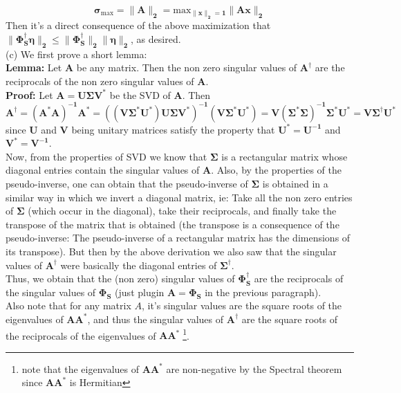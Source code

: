 \documentclass[a4paper,11pt]{article}
\numberwithin{definition}{section}
\numberwithin{mytheorem}{subsection}
\begin{document}
$$\boldsymbol{\sigma_{\mathrm{max}} = \lVert A\rVert_2 = \mathrm{max}_{\lVert x\rVert_2 = 1}\lVert Ax\rVert_2}$$
Then it's a direct consequence of the above maximization that $\boldsymbol{\lVert\Phi_S^{\dagger}\eta\rVert_2 \leq \lVert\Phi_S^{\dagger}\rVert_2\lVert\eta\rVert_2}$, as desired.
\\
(c) We first prove a short lemma:\\
\textbf{Lemma: } Let $\boldsymbol{A}$ be any matrix. Then the non zero singular values of $\boldsymbol{A^{\dagger}}$ are the reciprocals of the non zero singular values of $\boldsymbol{A}$.\\
\textbf{Proof: } Let $\boldsymbol{A = U\Sigma V^*}$ be the SVD of $\boldsymbol{A}$. Then 
$$\boldsymbol{A^{\dagger} = (A^*A)^{-1}A^* = ((V\Sigma^*U^*)U\Sigma V^*)^{-1}(V\Sigma^*U^*) = V(\Sigma^*\Sigma)^{-1}\Sigma^*U^* = V\Sigma^{\dagger}U^*}$$
since $\boldsymbol{U}$ and $\boldsymbol{V}$ being unitary matrices satisfy the property that $\boldsymbol{U^* = U^{-1}}$ and $\boldsymbol{V^* = V^{-1}}$.\\
Now, from the properties of SVD we know that $\boldsymbol{\Sigma}$ is a rectangular matrix whose diagonal entries contain the singular values of $\boldsymbol{A}$. Also, by the properties of the pseudo-inverse, one can obtain that the pseudo-inverse of $\boldsymbol{\Sigma}$ is obtained in a similar way in which we invert a diagonal matrix, ie: Take all the non zero entries of $\boldsymbol{\Sigma}$ (which occur in the diagonal), take their reciprocals, and finally take the transpose of the matrix that is obtained (the transpose is a consequence of the pseudo-inverse: The pseudo-inverse of a rectangular matrix has the dimensions of its transpose). But then by the above derivation we also saw that the singular values of $\boldsymbol{A^{\dagger}}$ were basically the diagonal entries of $\boldsymbol{\Sigma^{\dagger}}$. \\
Thus, we obtain that the (non zero) singular values of $\boldsymbol{\Phi_S^{\dagger}}$ are the reciprocals of the singular values of $\boldsymbol{\Phi_S}$ (just plugin $\boldsymbol{A = \Phi_S}$ in the previous paragraph).\\
Also note that for any matrix $A$, it's singular values are the square roots of the eigenvalues of $\boldsymbol{AA^*}$, and thus the singular values of $\boldsymbol{A^{\dagger}}$ are the square roots of the reciprocals of the eigenvalues of $\boldsymbol{AA^*}\;$\footnote{note that the eigenvalues of $\boldsymbol{AA^*}$ are non-negative by the Spectral theorem since $\boldsymbol{AA^*}$ is Hermitian}.\\
\end{document}
